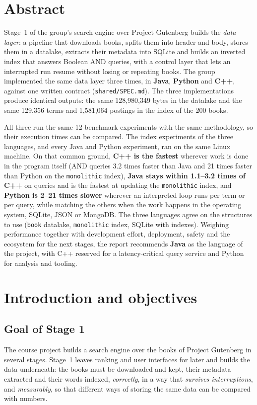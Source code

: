 \documentclass[11pt,a4paper]{article}
\newcommand{\code}[1]{\texttt{#1}}
\begin{document}
\section*{Abstract}
Stage~1 of the group's search engine over Project Gutenberg builds the \emph{data layer}: a pipeline
that downloads books, splits them into header and body, stores them in a datalake, extracts their
metadata into SQLite and builds an inverted index that answers Boolean AND queries, with a control
layer that lets an interrupted run resume without losing or repeating books. The group implemented
the same data layer three times, in \textbf{Java}, \textbf{Python} and \textbf{C++}, against one
written contract (\code{shared/SPEC.md}). The three implementations produce identical outputs: the
same 128,980,349 bytes in the datalake and the same 129,356 terms and 1,581,064 postings in the index
of the 200 books.

All three run the same 12 benchmark experiments with the same methodology, so their execution times
can be compared. The index experiments of the three languages, and every Java and Python experiment,
ran on the same Linux machine. On that common ground, \textbf{C++ is the fastest} wherever work is done
in the program itself (AND queries 3.2 times faster than Java and 21 times faster than Python on the
\code{monolithic} index), \textbf{Java stays within 1.1--3.2 times of C++} on queries and is the
fastest at updating the \code{monolithic} index, and \textbf{Python is 2--21 times slower} wherever an
interpreted loop runs per term or per query, while matching the others when the work happens in the
operating system, SQLite, JSON or MongoDB. The three languages agree on the structures to use
(\code{book} datalake, \code{monolithic} index, SQLite with indexes). Weighing performance together
with development effort, deployment, safety and the ecosystem for the next stages, the report
recommends \textbf{Java} as the language of the project, with C++ reserved for a latency-critical
query service and Python for analysis and tooling.

\tableofcontents
\newpage

\section{Introduction and objectives}\label{sec:intro}

\subsection{Goal of Stage 1}
The course project builds a search engine over the books of Project Gutenberg in several stages.
Stage~1 leaves ranking and user interfaces for later and builds the data underneath: the books must be
downloaded and kept, their metadata extracted and their words indexed, \emph{correctly}, in a way
that \emph{survives interruptions}, and \emph{measurably}, so that different ways of storing the same
data can be compared with numbers.
\end{document}
